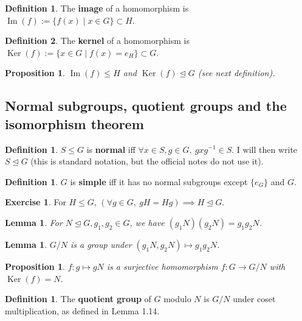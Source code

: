 \documentclass[12pt]{article}
\newtheorem{lem}[thm]{Lemma}
\newtheorem{prop}[thm]{Proposition}
\theoremstyle{definition}
\newtheorem{defn}[thm]{Definition}
\newtheorem*{defn*}{Definition}
\newtheorem{exr}[thm]{Exercise}
\newcommand{\normsg}{\trianglelefteq}
\DeclareMathOperator{\Img}{Im}
\DeclareMathOperator{\Ker}{Ker}
\begin{document}
\begin{defn*}
  The \textbf{image} of a homomorphism is $\Img(f) := \{f(x) \mid x \in G\} \subset H$.
\end{defn*}

\begin{defn*}
  The \textbf{kernel} of a homomorphism is $\Ker(f) := \{ x \in G \mid f(x) = e_H\} \subset G$.
\end{defn*}

\begin{prop}
  $\Img(f) \leq H$ and $\Ker(f) \normsg G$ (see next definition).
\end{prop}

\subsection{Normal subgroups, quotient groups and the isomorphism theorem}

\begin{defn}
  $S \leq G$ is \textbf{normal} iff $\forall x \in S, g \in G,\ gxg^{-1} \in S$.
  I will then write $S \normsg G$ (this is standard notation, but the official notes do not use it).
\end{defn}

\begin{defn}
  $G$ is \textbf{simple} iff it has no normal subgroups except $\{e_G\}$ and $G$.
\end{defn}

\begin{exr}
  For $H \leq G$, $(\forall g \in G,\ gH = Hg) \implies H \normsg G$.
\end{exr}

\begin{lem}
  For $N \normsg G, g_1, g_2 \in G$, we have $(g_1N)(g_2N) = g_1g_2N$.
\end{lem}

\begin{lem}
  $G / N$ is a group under $(g_1N, g_2N) \mapsto g_1g_2N$.
\end{lem}

\begin{prop}
  $f : g \mapsto gN$ is a surjective homomorphism $f : G \to G / N$ with $\Ker(f) = N$.
\end{prop}

\begin{defn}
  The \textbf{quotient group} of $G$ modulo $N$ is $G / N$ under coset multiplication, as defined in Lemma 1.14.
\end{defn}
\end{document}
